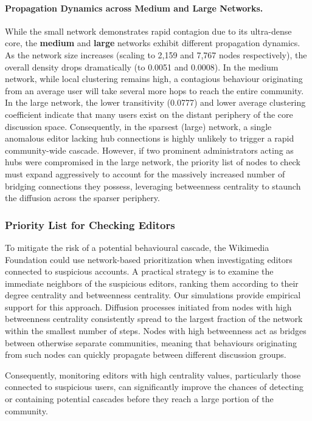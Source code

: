 \documentclass[conference]{IEEEtran}
\begin{document}
\paragraph{Propagation Dynamics across Medium and Large Networks.}
While the small network demonstrates rapid contagion due to its ultra-dense core, the \textbf{medium} and \textbf{large} networks exhibit different propagation dynamics. As the network size increases (scaling to 2,159 and 7,767 nodes respectively), the overall density drops dramatically (to 0.0051 and 0.0008). In the medium network, while local clustering remains high, a contagious behaviour originating from an average user will take several more hops to reach the entire community. In the large network, the lower transitivity (0.0777) and lower average clustering coefficient indicate that many users exist on the distant periphery of the core discussion space. Consequently, in the sparsest (large) network, a single anomalous editor lacking hub connections is highly unlikely to trigger a rapid community-wide cascade. However, if two prominent administrators acting as hubs were compromised in the large network, the priority list of nodes to check must expand aggressively to account for the massively increased number of bridging connections they possess, leveraging betweenness centrality to staunch the diffusion across the sparser periphery.

\subsubsection{Priority List for Checking Editors}
To mitigate the risk of a potential behavioural cascade, the Wikimedia Foundation could use network-based prioritization when investigating editors connected to suspicious accounts. A practical strategy is to examine the immediate neighbors of the suspicious editors, ranking them according to their degree centrality and betweenness centrality\cite{topic3, topic4, newman2003}. Our simulations provide empirical support for this approach. Diffusion processes initiated from nodes with high betweenness centrality consistently spread to the largest fraction of the network within the smallest number of steps. Nodes with high betweenness act as bridges between otherwise separate communities, meaning that behaviours originating from such nodes can quickly propagate between different discussion groups. 

Consequently, monitoring editors with high centrality values, particularly those connected to suspicious users, can significantly improve the chances of detecting or containing potential cascades before they reach a large portion of the community.
\end{document}
